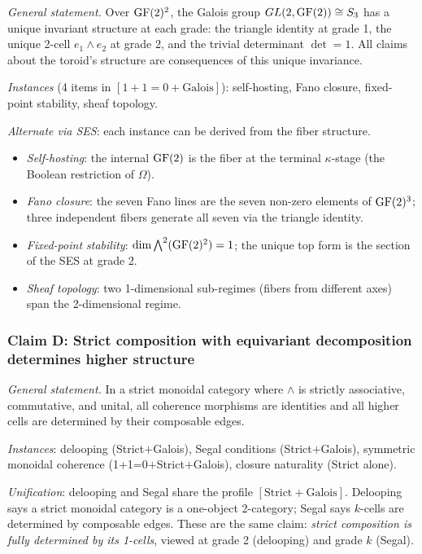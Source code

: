 \emph{General statement.}
Over $\operatorname{GF}(2)^2$, the Galois group $GL(2, \operatorname{GF}(2))
\cong S_3$ has a unique invariant structure at each
grade: the triangle identity at grade 1, the unique
2-cell $e_1 \wedge e_2$ at grade 2, and the trivial
determinant $\det = 1$. All claims about the toroid's
structure are consequences of this unique invariance.

\emph{Instances} (4 items in $[1{+}1{=}0{+}
\mathrm{Galois}]$): self-hosting, Fano closure,
fixed-point stability, sheaf topology.

\emph{Alternate via SES}: each instance can be derived
from the fiber structure.
\begin{itemize}[nosep]
  \item \emph{Self-hosting}: the internal $\operatorname{GF}(2)$ is
    the fiber at the terminal $\kappa$-stage (the Boolean
    restriction of $\Omega$).
  \item \emph{Fano closure}: the seven Fano lines are the
    seven non-zero elements of $\operatorname{GF}(2)^3$; three
    independent fibers generate all seven via the
    triangle identity.
  \item \emph{Fixed-point stability}:
    $\dim \bigwedge^2(\operatorname{GF}(2)^2) = 1$; the unique
    top form is the section of the SES at grade 2.
  \item \emph{Sheaf topology}: two 1-dimensional
    sub-regimes (fibers from different axes) span
    the 2-dimensional regime.
\end{itemize}

\subsubsection*{Claim D: Strict composition with
  equivariant decomposition determines higher structure}

\emph{General statement.}
In a strict monoidal category where $\wedge$ is strictly
associative, commutative, and unital, all coherence
morphisms are identities and all higher cells are
determined by their composable edges.

\emph{Instances}: delooping (Strict${+}$Galois),
Segal conditions (Strict${+}$Galois), symmetric monoidal
coherence (1+1=0${+}$Strict${+}$Galois), closure
naturality (Strict alone).

\emph{Unification}: delooping and Segal share the
profile $[\mathrm{Strict}{+}\mathrm{Galois}]$.
Delooping says a strict monoidal category is a
one-object 2-category; Segal says $k$-cells are
determined by composable edges. These are the same
claim: \emph{strict composition is fully determined
by its 1-cells}, viewed at grade 2 (delooping) and
grade $k$ (Segal).


